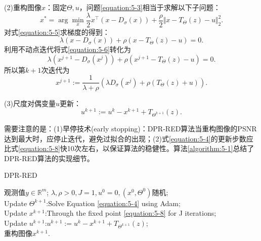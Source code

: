 (2)重构图像$x$：固定$\Theta,u$，问题\eqref{equation:5-3}相当于求解以下子问题：
\begin{equation} \label{equation:5-5}
	x^*=\arg\min_{x}\frac{\lambda}{2}x^\top(x-D_{\sigma}(x))+\frac{\rho}{2}\Vert{x-T_{\Theta}(z)-u}\Vert_2^2.
\end{equation}
对式\eqref{equation:5-5}求梯度的得到：
\begin{equation} \label{equation:5-6}
	\lambda{(x-D_{\sigma}(x))}+\rho(x-T_{\Theta}(z)-u)=0.
\end{equation}
利用不动点迭代将式\eqref{equation:5-6}转化为
\begin{equation} \label{equation:5-7}
	\lambda{(x^{j+1}-D_{\sigma}(x^{j}))}+\rho(x^{j+1}-T_{\Theta}(z)-u)=0.
\end{equation}
所以第$k+1$次迭代为
\begin{equation} \label{equation:5-8}
	x^{j+1}:=\frac{1}{\lambda+\rho}(\lambda{D_{\sigma}(x^j)}+\rho(T_{\Theta}(z)+u)).
\end{equation}

(3)尺度对偶变量$u$更新：
\begin{equation} \label{equation:5-9}
	u^{k+1}:=u^k-x^{k+1}+T_{\Theta^{k+1}}(z).
\end{equation}

需要注意的是：(1)早停技术(early stopping)：DPR-RED算法当重构图像的PSNR达到最大时，应停止迭代，避免过拟合的出现；(2)式\eqref{equation:5-4}的更新步数应比式\eqref{equation:5-8}快10次左右，以保证算法的稳健性。算法\ref{algorithm:5-1}总结了DPR-RED算法的实现细节。
\begin{algorithm}[!htbp]
	\caption{DPR-RED}
	\label{algorithm:5-1}
	\begin{algorithmic}[1]
		\REQUIRE	观测值$y\in \mathbb{R}^m$; %
		\ENSURE		%
		$\lambda,\rho>0, J=1, u^0=0, (x^0,\Theta^0)$随机; \\
		
		\STATE	Update $\Theta^{k+1}$:Solve Equation \eqref{equation:5-4} using Adam; \\  %
		\STATE	Update $x^{k+1}$:Through the fixed point \eqref{equation:5-8} for J iterations; \\	%
		\STATE	Update $u^{k+1}$:$u^{k+1}:=u^k-x^{k+1}+T_{\Theta^{k+1}}(z)$; \\ %
		\ENDWHILE
		\RETURN 重构图像$x^{k+1}$. %
	\end{algorithmic}
\end{algorithm}

